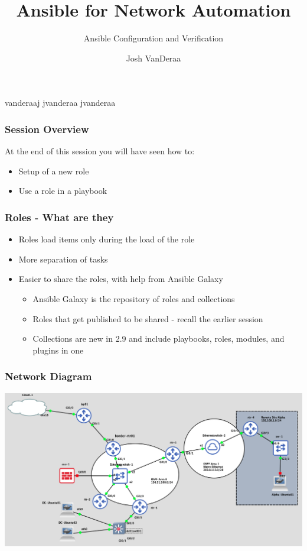 \documentclass[aspectratio=169]{beamer}
\title{Ansible for Network Automation}
\subtitle{Ansible Configuration and Verification}
\date{}
\author{Josh VanDeraa}
\begin{document}
\begin{frame}
  \maketitle
  \footnotesize
  \faTwitter vanderaaj \hfill \faGithub jvanderaa \hfill \faSlack jvanderaa
\end{frame}

\begin{frame}
    \frametitle{Session Overview}
    At the end of this session you will have seen how to:
    \begin{itemize}
      \item <2-> Setup of a new role
      \item <3-> Use a role in a playbook
    \end{itemize}
  \end{frame}

  \begin{frame}[t]
    \frametitle{Roles - What are they}
      \begin{itemize}
        \item <2-> Roles load items only during the load of the role
        \item <3-> More separation of tasks
        \item <4-> Easier to share the roles, with help from Ansible Galaxy
        \begin{itemize}
          \item <4-> Ansible Galaxy is the repository of roles and collections
          \item <5-> Roles that get published to be shared - recall the earlier session
          \item <6-> Collections are new in 2.9 and include playbooks, roles, modules, and plugins in one
        \end{itemize}
      \end{itemize}
  \end{frame}

  \begin{frame}
    \frametitle{Network Diagram}
    \begin{center}
        \includegraphics[height=0.8\paperheight]{assets/web_server_setup.png}    
    \end{center}
  \end{frame}
\end{document}

